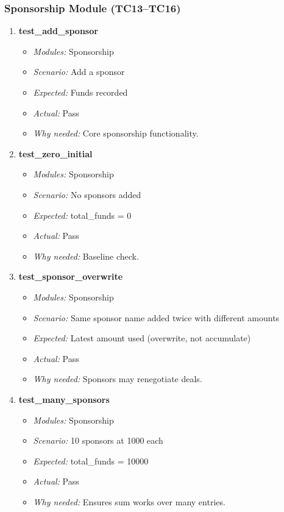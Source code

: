 \documentclass{article}
\begin{document}
\subsubsection*{Sponsorship Module (TC13--TC16)}
\begin{enumerate}[resume, label=\textbf{TC\arabic*.}]

\item \textbf{test\_add\_sponsor}
\begin{itemize}[noitemsep]
  \item \textit{Modules:} Sponsorship
  \item \textit{Scenario:} Add a sponsor
  \item \textit{Expected:} Funds recorded
  \item \textit{Actual:} Pass
  \item \textit{Why needed:} Core sponsorship functionality.
\end{itemize}

\item \textbf{test\_zero\_initial}
\begin{itemize}[noitemsep]
  \item \textit{Modules:} Sponsorship
  \item \textit{Scenario:} No sponsors added
  \item \textit{Expected:} total\_funds = 0
  \item \textit{Actual:} Pass
  \item \textit{Why needed:} Baseline check.
\end{itemize}

\item \textbf{test\_sponsor\_overwrite}
\begin{itemize}[noitemsep]
  \item \textit{Modules:} Sponsorship
  \item \textit{Scenario:} Same sponsor name added twice with different amounts
  \item \textit{Expected:} Latest amount used (overwrite, not accumulate)
  \item \textit{Actual:} Pass
  \item \textit{Why needed:} Sponsors may renegotiate deals.
\end{itemize}

\item \textbf{test\_many\_sponsors}
\begin{itemize}[noitemsep]
  \item \textit{Modules:} Sponsorship
  \item \textit{Scenario:} 10 sponsors at 1000 each
  \item \textit{Expected:} total\_funds = 10000
  \item \textit{Actual:} Pass
  \item \textit{Why needed:} Ensures sum works over many entries.
\end{itemize}

\end{enumerate}
\end{document}
